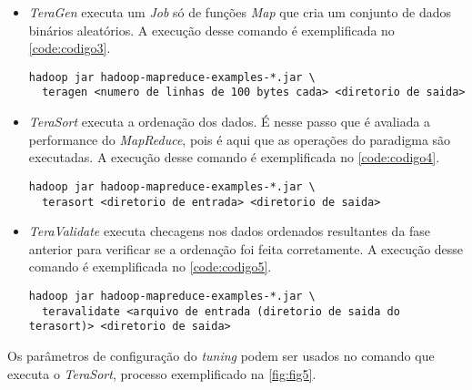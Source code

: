 \begin{itemize}
  \item \textit{TeraGen} executa um \textit{Job} só de funções \textit{Map} que cria um conjunto de dados binários aleatórios. A execução desse comando é exemplificada no \autoref{code:codigo3}.
  
  \begin{lstlisting}[caption={Exemplo de execução do \textit{TeraGen} adaptado de \cite{HadoopBook15}}, label=code:codigo3]
  hadoop jar hadoop-mapreduce-examples-*.jar \
  teragen <numero de linhas de 100 bytes cada> <diretorio de saida>
  \end{lstlisting}
  
  \item \textit{TeraSort} executa a ordenação dos dados. É nesse passo que é avaliada a performance do \textit{MapReduce}, pois é aqui que as operações do paradigma são executadas. A execução desse comando é exemplificada no \autoref{code:codigo4}.
  \begin{lstlisting}[caption={Exemplo de execução do \textit{TeraSort} adaptado de \cite{HadoopBook15}}, label=code:codigo4]
  hadoop jar hadoop-mapreduce-examples-*.jar \
  terasort <diretorio de entrada> <diretorio de saida>
  \end{lstlisting}  

  \item \textit{TeraValidate} executa checagens nos dados ordenados resultantes da fase anterior para verificar se a ordenação foi feita corretamente. A execução desse comando é exemplificada no \autoref{code:codigo5}.
  \newpage
  \begin{lstlisting}[caption={Exemplo de execução do \textit{TeraValidate} adaptado de \cite{HadoopBook15}}, label=code:codigo5]
  hadoop jar hadoop-mapreduce-examples-*.jar \
  teravalidate <arquivo de entrada (diretorio de saida do terasort)> <diretorio de saida>
  \end{lstlisting}

\end{itemize}

Os parâmetros de configuração do \textit{\gls{tuning}} podem ser usados no comando que executa o \textit{TeraSort}, processo exemplificado na \autoref{fig:fig5}.



